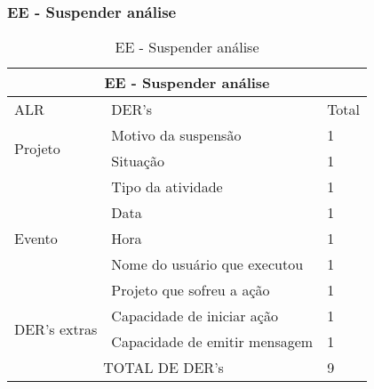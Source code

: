 \subsubsection{EE - Suspender análise}

\begin{table}[!h]
\centering
\caption{EE - Suspender análise}
\label{ee_suspender_analise}
\begin{tabular}{|l|l|l|}
\hline
\multicolumn{3}{|c|}{EE - Suspender análise}                          \\ \hline
ALR                           & DER's                         & Total \\ \hline
\multirow{2}{*}{Projeto}      & Motivo da suspensão           & 1     \\ \cline{2-3} 
                              & Situação                      & 1     \\ \hline
\multirow{5}{*}{Evento}       & Tipo da atividade             & 1     \\ \cline{2-3} 
                              & Data                          & 1     \\ \cline{2-3} 
                              & Hora                          & 1     \\ \cline{2-3} 
                              & Nome do usuário que executou  & 1     \\ \cline{2-3} 
                              & Projeto que sofreu a ação     & 1     \\ \hline
\multirow{2}{*}{DER's extras} & Capacidade de iniciar ação    & 1     \\ \cline{2-3} 
                              & Capacidade de emitir mensagem & 1     \\ \hline
\multicolumn{2}{|c|}{TOTAL DE DER's}                          & 9     \\ \hline
\end{tabular}
\end{table}
 
 
\vfill
\pagebreak
